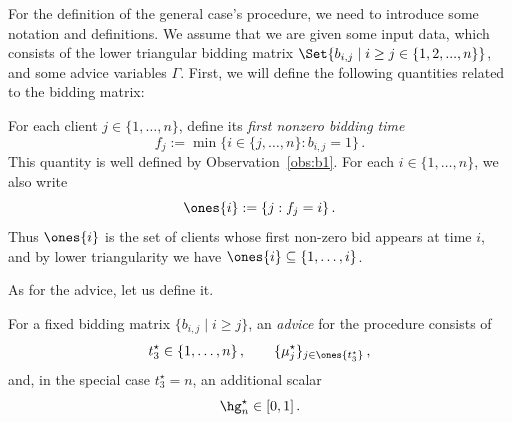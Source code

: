 \newcommand{\Mrho}{2-(\gamma-1)^2}
\newcommand{\Mrhomone}{1-\varepsilon^2}
\newcommand{\Mcoeff}{\gamma}
\newcommand{\Mcoeffadd}{\gamma+\varepsilon^2}
\newcommand{\Mcoeffpone}{1+\gamma}
\newcommand{\Mcoeffmone}{\varepsilon}
\newcommand{\Monemcoeffmone}{1-\varepsilon}
\newcommand{\Mtone}{\tau}
\newcommand{\MRtone}{\bar\tau}
\newcommand{\Mttwo}{1-\theta}
\newcommand{\MRttwo}{\theta}
\newcommand{\Mfrac}{\frac{\varepsilon}{\tau}}

For the definition of the general case's procedure, we need to introduce some notation and definitions. We assume that we are given some input data, which consists of the lower triangular bidding matrix $\Set{b_{i,j} \mid i \geq j \in \{1, 2, ..., n\}}$, and some advice variables $\Gamma$. First, we will define the following quantities related to the bidding matrix:

\begin{definition}
    For each client $j\in\{1,\dots,n\}$, define its \emph{first nonzero bidding time}
    \begin{equation*}
        f_j := \min\{i\in\{j,\dots,n\} : b_{i,j}=1\}\,.
    \end{equation*}
    This quantity is well defined by Observation~\ref{obs:b1}. For each $i\in\{1,\dots,n\}$, we also write
    \begin{equation*}
        \ones{i} := \{j : f_j=i\}\,.
    \end{equation*}
    Thus $\ones{i}$ is the set of clients whose first non-zero bid appears at time $i$, and by lower triangularity we have $\ones{i}\subseteq\{1,\dots,i\}$.
\end{definition}

As for the advice, let us define it.

\begin{definition}\label{def:auxiliary-input}
    For a fixed bidding matrix $\{b_{i,j}\mid i\ge j\}$, an \emph{advice} for the procedure consists of
    \begin{equation*}
        t_3^\star \in \{1,\dots,n\}\,, \qquad
        \{\mu_j^\star\}_{j\in\ones{t_3^\star}}\,,
    \end{equation*}
    and, in the special case $t_3^\star=n$, an additional scalar
    \begin{equation*}
        \hg_n^\star \in [0,1]\,.
    \end{equation*}
\end{definition}


